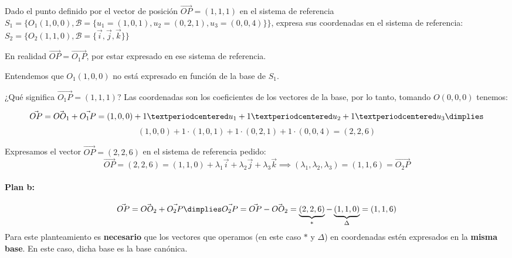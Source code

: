 





\begin{problem}

Dado el punto definido por el vector de posición $\vec{OP} = (1,1,1)$ en el sistema de referencia $S_1 = \{O_1(1,0,0), \mathcal{B} = \{u_1 = (1,0,1), u_2 = (0,2,1), u_3 = (0,0,4)\}\}$, expresa sus coordenadas en el sistema de referencia: 
%
$S_2=\{O_2(1,1,0), \mathcal{B} = \{\vec{i},\vec{j},\vec{k}\}\}$

\solution

En realidad $\vec{OP} = \vec{O_1P}$, por estar expresado en ese sistema de referencia. 

Entendemos que $O_1(1,0,0)$ no está expresado en función de la base de $S_1$.

¿Qué significa $\vec{O_1P} = (1,1,1)$? Las coordenadas son los coeficientes de los vectores de la base, por lo tanto, tomando $O(0,0,0)$ tenemos:

\[
\vec{OP} = \vec{OO_1} + \vec{O_1P} = (1,0,0) + 1·u_1 + 1·u_2+ 1·u_3  \dimplies\]
\[ (1,0,0) + 1·(1,0,1) +1 ·(0,2,1)  + 1·(0,0,4) = (2,2,6)
\]

Expresamos el vector $\vec{OP}=(2,2,6)$ en el sistema de referencia pedido:
\[\vec{OP} = (2,2,6) = (1,1,0) + \lambda_1\vec{i}+ \lambda_2\vec{j}+ \lambda_3\vec{k} \implies (\lambda_1,\lambda_2,\lambda_3) = (1,1,6) = \vec{O_2P}\]

\vspace{-0.3cm}
\paragraph{Plan b:} 
\[\vec{OP} = \vec{OO_2} + \vec{O_2P} \dimplies \vec{O_2P} = \vec{OP} - \vec{OO_2} = \underbrace{(2,2,6)}_{\ast} - \underbrace{(1,1,0)}_{\Delta} = (1,1,6)\]
\obs Para este planteamiento es \textbf{necesario} que los vectores que operamos (en este caso $\ast$ y $\Delta$) en coordenadas estén expresados en la \textbf{misma base}. 
%
En este caso, dicha base es la base canónica.


\end{problem}
